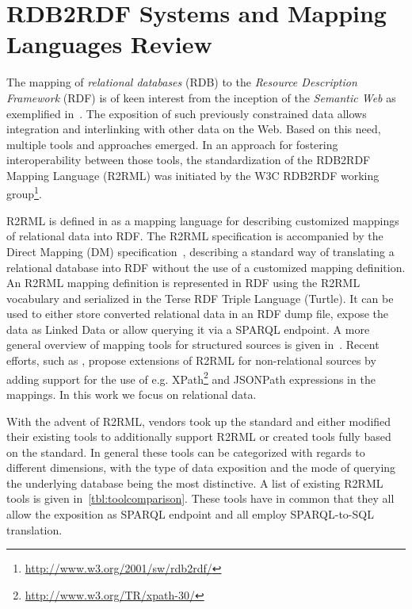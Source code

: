 \section{RDB2RDF Systems and Mapping Languages Review}
\label{sec:mapping-language-review}

The mapping of \emph{relational databases} (RDB) to the \emph{Resource Description Framework} (RDF) is of keen interest from the inception of the \emph{Semantic Web} as exemplified in~\cite{TBL98}.
The exposition of such previously constrained data allows integration and interlinking with other data on the Web.
Based on this need, multiple tools and approaches emerged.
In an approach for fostering interoperability between those tools, the standardization of the RDB2RDF Mapping Language (R2RML) was initiated by the W3C RDB2RDF working group\footnote{\url{http://www.w3.org/2001/sw/rdb2rdf/}}.


R2RML is defined in \cite{r2rml} as a  mapping language for describing customized mappings of relational data into RDF.
The R2RML specification is accompanied by the Direct Mapping (DM) specification~\cite{directmapping}, describing a standard way of translating a relational database into RDF without the use of a customized mapping definition.
An R2RML mapping definition is represented in RDF using the R2RML vocabulary and serialized in the Terse RDF Triple Language (Turtle).
It can be used to either store converted relational data in an RDF dump file, expose the data as Linked Data or allow querying it via a SPARQL endpoint.
A more general overview of mapping tools for structured sources is given in~\cite{UnbehauenSeCo2012}.
Recent efforts, such as \cite{dimou2014rml}, propose extensions of R2RML for non-relational sources by adding support for the use of e.g. XPath\footnote{\url{http://www.w3.org/TR/xpath-30/}} and JSONPath expressions in the mappings.
In this work we focus on relational data.



With the advent of R2RML, vendors took up the standard and either modified their existing tools to additionally support R2RML or created tools fully based on the standard.
In general these tools can be categorized with regards to different dimensions, with the type of data exposition and the mode of querying the underlying database being the most distinctive.
A list of existing R2RML tools is given in~\autoref{tbl:toolcomparison}.
These tools have in common that they all allow the exposition as SPARQL endpoint and all employ SPARQL-to-SQL translation.

